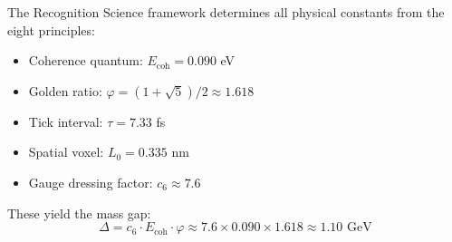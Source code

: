 \documentclass[11pt]{article}
\numberwithin{equation}{section}
\theoremstyle{definition}
\theoremstyle{remark}
\begin{document}
The Recognition Science framework determines all physical constants from the eight principles:

\begin{itemize}
\item Coherence quantum: $E_{\text{coh}} = 0.090$ eV
\item Golden ratio: $\varphi = (1+\sqrt{5})/2 \approx 1.618$
\item Tick interval: $\tau = 7.33$ fs
\item Spatial voxel: $L_0 = 0.335$ nm
\item Gauge dressing factor: $c_6 \approx 7.6$
\end{itemize}

These yield the mass gap:
\begin{equation}
\Delta = c_6 \cdot E_{\text{coh}} \cdot \varphi \approx 7.6 \times 0.090 \times 1.618 \approx 1.10 \text{ GeV}
\end{equation}
\end{document}

